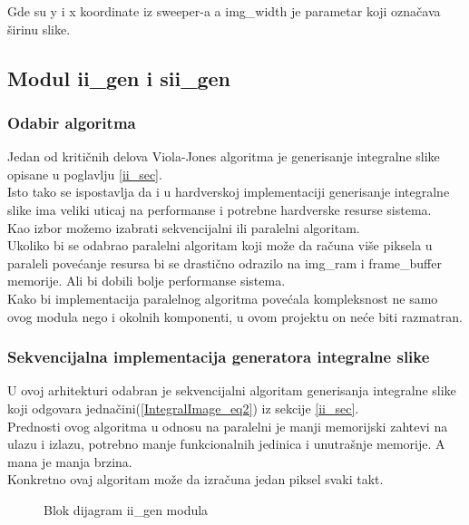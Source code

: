 Gde su y i x koordinate iz sweeper-a a img\_width je parametar koji označava
širinu slike.

\newpage

\subsection{Modul ii\_gen i sii\_gen} \label{ii_sii_gen_sec}

\subsubsection{Odabir algoritma}\label{ii_alg_sel_sec}

Jedan od kritičnih delova Viola-Jones algoritma je generisanje integralne slike
opisane u poglavlju \ref{ii_sec}. \\
Isto tako se ispostavlja da i u hardverskoj implementaciji generisanje
integralne slike ima veliki uticaj na performanse i potrebne hardverske resurse sistema. \\

Kao izbor možemo izabrati sekvencijalni ili paralelni algoritam. \\
Ukoliko bi se odabrao paralelni algoritam koji može da računa više piksela u paraleli
povećanje resursa bi se drastično odrazilo na img\_ram i frame\_buffer memorije.
Ali bi dobili bolje performanse sistema. \\
Kako bi implementacija paralelnog algoritma povećala kompleksnost ne samo ovog
modula nego i okolnih komponenti, u ovom projektu on neće biti razmatran.

\subsubsection{Sekvencijalna implementacija generatora integralne slike}\label{ii_seq_alg_sec}

U ovoj arhitekturi odabran je sekvencijalni algoritam generisanja integralne
slike koji odgovara jednačini(\ref{IntegralImage_eq2}) iz sekcije \ref{ii_sec}.
\\
Prednosti ovog algoritma u odnosu na paralelni je manji memorijski zahtevi na
ulazu i izlazu, potrebno manje funkcionalnih jedinica i unutrašnje memorije. A
mana je manja brzina. \\
Konkretno ovaj algoritam može da izračuna jedan piksel svaki takt. \\

\begin{figure}[H]
  \centering
  \scalebox{1.0}{
    
    }
\caption{Blok dijagram ii\_gen modula}
\label{ii_gen}
\end{figure}

